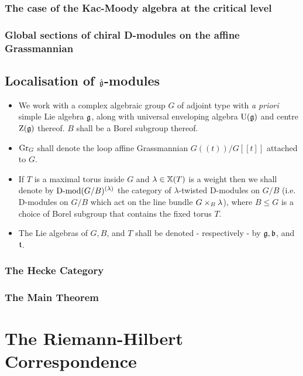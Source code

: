             \subsubsection{The case of the Kac-Moody algebra at the critical level}
            
            \subsubsection{Global sections of chiral D-modules on the affine Grassmannian}
            
        \subsection{Localisation of \texorpdfstring{$\hat{\mathfrak{g}}$}{}-modules}
            \begin{convention} \label{conv: quantum_beilinson_bernstein_localisation_conventions}
                \noindent
                \begin{itemize}
                    \item We work with a complex algebraic group $G$ of adjoint type with \textit{a priori} simple Lie algebra $\mathfrak{g}$, along with universal enveloping algebra $\mathrm{U}(\mathfrak{g})$ and centre $\mathrm{Z}(\mathfrak{g})$ thereof. $B$ shall be a Borel subgroup thereof. 
                    \item $\mathrm{Gr}_G$ shall denote the loop affine Grassmannian $G(\!(t)\!)/G[\![t]\!]$ attached to $G$.
                    \item If $T$ is a maximal torus inside $G$ and $\lambda \in \mathbb{X}(T)$ is a weight then we shall denote by $\mathrm{D}\text{-}\mathrm{mod}(G/B)^{(\lambda)}$ the category of $\lambda$-twisted D-modules on $G/B$ (i.e. D-modules on $G/B$ which act on the line bundle $G \x_B \lambda$), where $B \leq G$ is a choice of Borel subgroup that contains the fixed torus $T$.
                    \item The Lie algebras of $G, B$, and $T$ shall be denoted - respectively - by $\mathfrak{g}, \mathfrak{b}$, and $\mathfrak{t}$.
                \end{itemize}
            \end{convention}
            
            \subsubsection{The Hecke Category}
            
            \subsubsection{The Main Theorem}
            
    \section{The Riemann-Hilbert Correspondence}